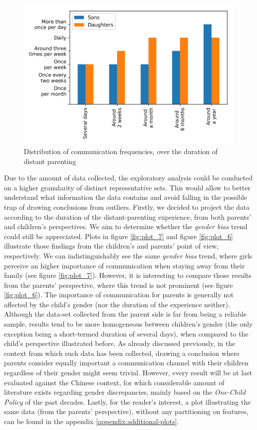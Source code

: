 \vfill
\begin{figure}[H]
    \centering
    \includegraphics[scale=0.58]{plots/plot_3.png}
    \caption{Distribution of communication frequencies, over the duration of distant parenting}
    \label{fig:plot_3}
\end{figure}

Due to the amount of data collected, the exploratory analysis could be conducted on a higher granularity of distinct representative sets. This would allow to better understand what information the data contains and avoid falling in the possible trap of drawing conclusions from outliers. Firstly, we decided to project the data according to the duration of the distant-parenting experience, from both parents' and children's perspectives. We aim to determine whether the \textit{gender bias} trend could still be appreciated. Plots in figure \ref{fig:plot_7} and figure \ref{fig:plot_6} illustrate those findings from the children's and parents' point of view, respectively. We can indistinguishably see the same \textit{gender bias} trend, where girls perceive an higher importance of communication when staying away from their family (see figure \ref{fig:plot_7}). However, it is interesting to compare those results from the parents' perspective, where this trend is not prominent (see figure \ref{fig:plot_6}). The importance of communication for parents is generally not affected by the child's gender (nor the duration of the experience neither). Although the data-set collected from the parent side is far from being a reliable sample, results tend to be more homogeneous between  children’s gender (the only exception being a short-termed duration of several days), when compared to the child’s  perspective  illustrated  before. As already discussed previously, in the context from which such data has been collected, drawing a conclusion where parents consider equally important a communication channel with their children regardless of their gender might seem trivial. However, every result will be at last evaluated against the Chinese context, for which considerable amount of literature exists regarding gender discrepancies, mainly based on the \textit{One-Child Policy} of the past decades. Lastly, for the reader's interest, a plot illustrating the same data (from the parents' perspective), without any partitioning on features, can be found in the appendix \ref{appendix:additional-plots}.

